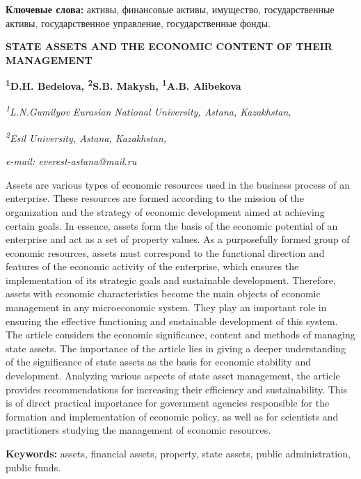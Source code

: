 {\bfseries Ключевые слова:} активы, финансовые активы, имущество,
государственные активы, государственное управление, государственные
фонды.

\begin{articleheader}
{\bfseries STATE ASSETS AND THE ECONOMIC CONTENT OF THEIR MANAGEMENT}

{\bfseries
\textsuperscript{1}D.H. Bedelova\textsuperscript{\envelope },
\textsuperscript{2}S.B. Makysh,
\textsuperscript{1}A.B. Alibekova}
\end{articleheader}

\begin{affiliation}
{\em \textsuperscript{1}L.N.Gumilyov Eurasian National University, Astana, Kazakhstan,}

{\em \textsuperscript{2}Esil University, Astana, Kazakhstan,}

\emph{e-mail: everest-astana@mail.ru}
\end{affiliation}

Assets are various types of economic resources used in the business
process of an enterprise. These resources are formed according to the
mission of the organization and the strategy of economic development
aimed at achieving certain goals. In essence, assets form the basis of
the economic potential of an enterprise and act as a set of property
values. As a purposefully formed group of economic resources, assets
must correspond to the functional direction and features of the economic
activity of the enterprise, which ensures the implementation of its
strategic goals and sustainable development. Therefore, assets with
economic characteristics become the main objects of economic management
in any microeconomic system. They play an important role in ensuring the
effective functioning and sustainable development of this system. The
article considers the economic significance, content and methods of
managing state assets. The importance of the article lies in giving a
deeper understanding of the significance of state assets as the basis
for economic stability and development. Analyzing various aspects of
state asset management, the article provides recommendations for
increasing their efficiency and sustainability. This is of direct
practical importance for government agencies responsible for the
formation and implementation of economic policy, as well as for
scientists and practitioners studying the management of economic
resources.

{\bfseries Keywords:} assets, financial assets, property, state assets,
public administration, public funds.

